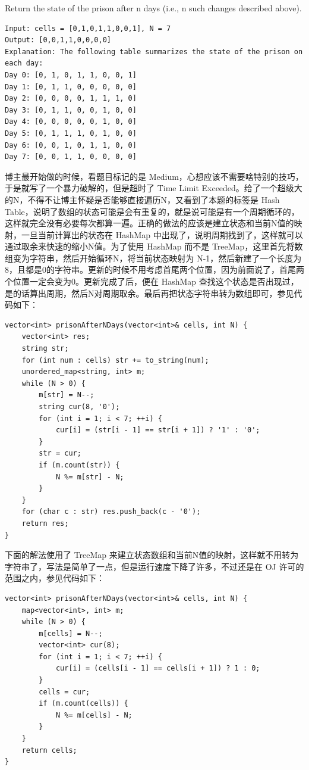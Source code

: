 \documentclass[9pt, b5paper]{article}
\begin{document}
Return the state of the prison after n days (i.e., n such changes described above).
\begin{verbatim}
Input: cells = [0,1,0,1,1,0,0,1], N = 7
Output: [0,0,1,1,0,0,0,0]
Explanation: The following table summarizes the state of the prison on each day:
Day 0: [0, 1, 0, 1, 1, 0, 0, 1]
Day 1: [0, 1, 1, 0, 0, 0, 0, 0]
Day 2: [0, 0, 0, 0, 1, 1, 1, 0]
Day 3: [0, 1, 1, 0, 0, 1, 0, 0]
Day 4: [0, 0, 0, 0, 0, 1, 0, 0]
Day 5: [0, 1, 1, 1, 0, 1, 0, 0]
Day 6: [0, 0, 1, 0, 1, 1, 0, 0]
Day 7: [0, 0, 1, 1, 0, 0, 0, 0]
\end{verbatim}
博主最开始做的时候，看题目标记的是 Medium，心想应该不需要啥特别的技巧，于是就写了一个暴力破解的，但是超时了 Time Limit Exceeded。给了一个超级大的N，不得不让博主怀疑是否能够直接遍历N，又看到了本题的标签是 Hash Table，说明了数组的状态可能是会有重复的，就是说可能是有一个周期循环的，这样就完全没有必要每次都算一遍。正确的做法的应该是建立状态和当前N值的映射，一旦当前计算出的状态在 HashMap 中出现了，说明周期找到了，这样就可以通过取余来快速的缩小N值。为了使用 HashMap 而不是 TreeMap，这里首先将数组变为字符串，然后开始循环N，将当前状态映射为 N-1，然后新建了一个长度为8，且都是0的字符串。更新的时候不用考虑首尾两个位置，因为前面说了，首尾两个位置一定会变为0。更新完成了后，便在 HashMap 查找这个状态是否出现过，是的话算出周期，然后N对周期取余。最后再把状态字符串转为数组即可，参见代码如下：
\begin{verbatim}
vector<int> prisonAfterNDays(vector<int>& cells, int N) {
    vector<int> res;
    string str;
    for (int num : cells) str += to_string(num);
    unordered_map<string, int> m;
    while (N > 0) {
        m[str] = N--;
        string cur(8, '0');
        for (int i = 1; i < 7; ++i) {
            cur[i] = (str[i - 1] == str[i + 1]) ? '1' : '0';
        }
        str = cur;
        if (m.count(str)) {
            N %= m[str] - N;
        }
    }
    for (char c : str) res.push_back(c - '0');
    return res;
}
\end{verbatim}
下面的解法使用了 TreeMap 来建立状态数组和当前N值的映射，这样就不用转为字符串了，写法是简单了一点，但是运行速度下降了许多，不过还是在 OJ 许可的范围之内，参见代码如下：
\begin{verbatim}
vector<int> prisonAfterNDays(vector<int>& cells, int N) {
    map<vector<int>, int> m;
    while (N > 0) {
        m[cells] = N--;
        vector<int> cur(8);
        for (int i = 1; i < 7; ++i) {
            cur[i] = (cells[i - 1] == cells[i + 1]) ? 1 : 0;
        }
        cells = cur;
        if (m.count(cells)) {
            N %= m[cells] - N;
        }
    }
    return cells;
}
\end{verbatim}
\end{document}
